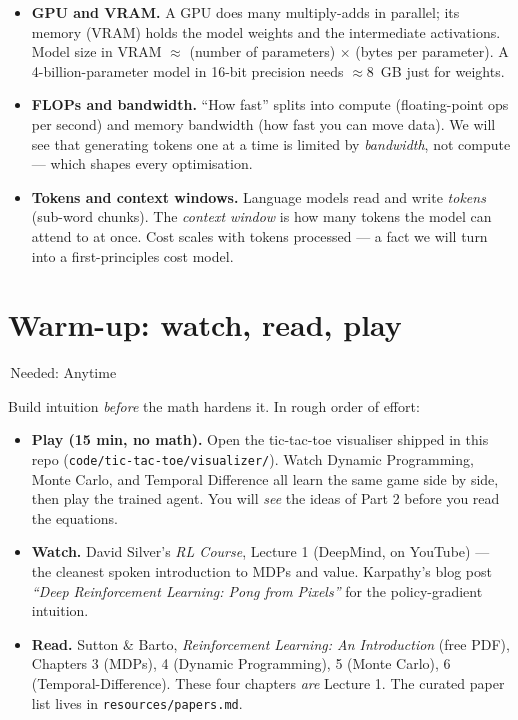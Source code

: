 \documentclass[11pt]{article}
\newcommand{\wk}[1]{{\sffamily\footnotesize\colorbox{slate!12}{\textcolor{slate}{\,Needed: #1\,}}}}
\begin{document}
\begin{itemize}
\item \textbf{GPU and VRAM.} A GPU does many multiply-adds in parallel; its memory (VRAM) holds the model weights and the intermediate activations. Model size in VRAM $\approx$ (number of parameters) $\times$ (bytes per parameter). A 4-billion-parameter model in 16-bit precision needs $\approx 8$~GB just for weights.
\item \textbf{FLOPs and bandwidth.} ``How fast'' splits into compute (floating-point ops per second) and memory bandwidth (how fast you can move data). We will see that generating tokens one at a time is limited by \emph{bandwidth}, not compute — which shapes every optimisation.
\item \textbf{Tokens and context windows.} Language models read and write \emph{tokens} (sub-word chunks). The \emph{context window} is how many tokens the model can attend to at once. Cost scales with tokens processed — a fact we will turn into a first-principles cost model.
\end{itemize}

\section{Warm-up: watch, read, play}
\wk{Anytime}

\vspace{0.4em}
Build intuition \emph{before} the math hardens it. In rough order of effort:

\begin{itemize}
\item \textbf{Play (15 min, no math).} Open the tic-tac-toe visualiser shipped in this repo (\texttt{code/tic-tac-toe/visualizer/}). Watch Dynamic Programming, Monte Carlo, and Temporal Difference all learn the same game side by side, then play the trained agent. You will \emph{see} the ideas of Part 2 before you read the equations.
\item \textbf{Watch.} David Silver's \emph{RL Course}, Lecture 1 (DeepMind, on YouTube) — the cleanest spoken introduction to MDPs and value. Karpathy's blog post \emph{``Deep Reinforcement Learning: Pong from Pixels''} for the policy-gradient intuition.
\item \textbf{Read.} Sutton \& Barto, \emph{Reinforcement Learning: An Introduction} (free PDF), Chapters 3 (MDPs), 4 (Dynamic Programming), 5 (Monte Carlo), 6 (Temporal-Difference). These four chapters \emph{are} Lecture 1. The curated paper list lives in \texttt{resources/papers.md}.
\end{itemize}
\end{document}
